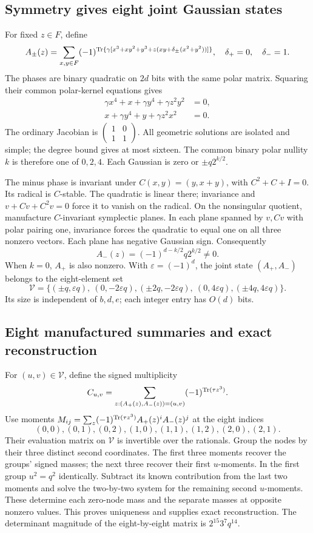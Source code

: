 \subsection{Symmetry gives eight joint Gaussian states}
For fixed $z\in F$, define
\[
 A_\pm(z)=\sum_{x,y\in F}(-1)^{\operatorname{Tr}\{\gamma[
 x^3+xy^2+y^3+z(xy+\delta_\pm(x^2+y^2))]\}},
 \quad\delta_+=0,\quad\delta_-=1.
\]
The phases are binary quadratic on $2d$ bits with the same polar matrix.
Squaring their common polar-kernel equations gives
\begin{align*}
 \gamma x^4+x+\gamma y^4+\gamma z^2y^2&=0,\\
 x+\gamma y^4+y+\gamma z^2x^2&=0.
\end{align*}
The ordinary Jacobian is
$\left(\begin{smallmatrix}1&0\\1&1\end{smallmatrix}\right)$.
All geometric solutions are isolated and simple; the degree bound gives
at most sixteen. The common binary polar nullity $k$ is therefore one
of $0,2,4$. Each Gaussian is zero or $\pm q2^{k/2}$.

The minus phase is invariant under $C(x,y)=(y,x+y)$, with
$C^2+C+I=0$. Its radical is $C$-stable. The quadratic is linear there;
invariance and $v+Cv+C^2v=0$ force it to vanish on the radical.
On the nonsingular quotient, manufacture $C$-invariant symplectic planes.
In each plane spanned by $v,Cv$ with polar pairing one, invariance forces
the quadratic to equal one on all three nonzero vectors. Each plane has
negative Gaussian sign. Consequently
\[
 A_-(z)=(-1)^{d-k/2}q2^{k/2}\ne0.
\]
When $k=0$, $A_+$ is also nonzero. With $\varepsilon=(-1)^d$, the joint
state $(A_+,A_-)$ belongs to the eight-element set
\[
 \mathcal V=\{(\pm q,\varepsilon q),\ (0,-2\varepsilon q),
 (\pm2q,-2\varepsilon q),\ (0,4\varepsilon q),
 (\pm4q,4\varepsilon q)\}.
\]
Its size is independent of $b,d,e$; each integer entry has $O(d)$ bits.

\subsection{Eight manufactured summaries and exact reconstruction}
For $(u,v)\in\mathcal V$, define the signed multiplicity
\[
 C_{u,v}=\sum_{z:(A_+(z),A_-(z))=(u,v)}(-1)^{\operatorname{Tr}(\tau z^3)}.
\]
Use moments $M_{ij}=\sum_z(-1)^{\operatorname{Tr}(\tau z^3)}A_+(z)^iA_-(z)^j$
at the eight indices
\[
 (0,0),(0,1),(0,2),(1,0),(1,1),(1,2),(2,0),(2,1).
\]
Their evaluation matrix on $\mathcal V$ is invertible over the rationals.
Group the nodes by their three distinct second coordinates. The first
three moments recover the groups' signed masses; the next three recover
their first $u$-moments. In the first group $u^2=q^2$ identically.
Subtract its known contribution from the last two moments and solve the
two-by-two system for the remaining second $u$-moments. These determine
each zero-node mass and the separate masses at opposite nonzero values.
This proves uniqueness and supplies exact reconstruction. The determinant
magnitude of the eight-by-eight matrix is $2^{15}3^7q^{14}$.

